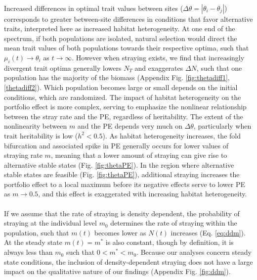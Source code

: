 \documentclass[twocolumn,preprintnumbers,amsmath,amssymb,superscriptaddress]{revtex4}
\begin{document}
\\ 
\noindent Increased differences in optimal trait values between sites ($\Delta\theta = \left|\theta_i - \theta_j\right|$) corresponds to greater between-site differences in conditions that favor alternative traits, interpreted here as increased habitat heterogeneity.
At one end of the spectrum, if both populations are isolated, natural selection would direct the mean trait values of both populations towards their respective optima, such that $\mu_i(t) \rightarrow \theta_i$ as $t\rightarrow\infty$.
However when straying exists, we find that increasingly divergent trait optima generally lowers $N_T$ and exaggerates $\Delta N$, such that one population has the majority of the biomass (Appendix Fig. \ref{fig:thetadiff1},\ref{thetadiff2}).
Which population becomes large or small depends on the initial conditions, which are randomized. 
The impact of habitat heterogeneity on the portfolio effect is more complex, serving to emphasize the nonlinear relationship between the stray rate and the PE, regardless of heritability.
The extent of the nonlinearity between $m$ and the PE depends very much on $\Delta\theta$, particularly when trait heritability is low ($h^2<0.5$).
As habitat heterogeneity increases, the fold bifurcation and associated spike in PE generally occurs for lower values of straying rate $m$, meaning that a lower amount of straying can give rise to alternative stable states (Fig. \ref{fig:thetaPE}).
In the region where alternative stable states are feasible (Fig. \ref{fig:thetaPE}), additional straying increases the portfolio effect to a local maximum before its negative effects serve to lower PE as $m\rightarrow 0.5$, and this effect is exaggerated with increasing habitat heterogeneity.
\\





\\
\noindent If we assume that the rate of straying is density dependent, the probability of straying at the individual level $m_0$ determines the rate of straying within the population, such that $m(t)$ becomes lower as $N(t)$ increases (Eq. \ref{eq:ddm}).
At the steady state $m(t)=m^*$ is also constant, though by definition, it is always less than $m_0$ such that $0 < m^* < m_0$.
Because our analyses concern steady state conditions, the inclusion of density-dependent straying does not have a large impact on the qualitative nature of our findings (Appendix Fig. \ref{fig:ddm}).
\end{document}
